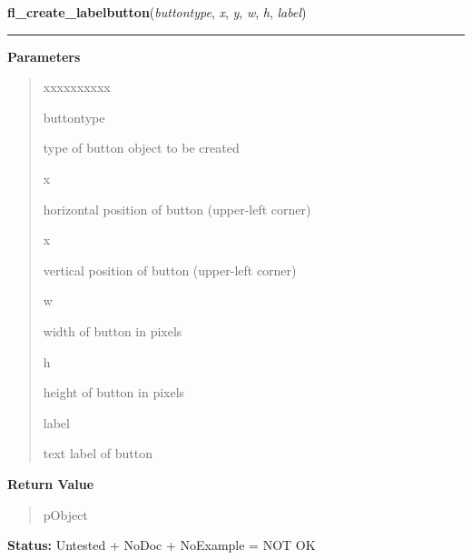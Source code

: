     \label{xformslib:library:fl_create_labelbutton}

    \vspace{0.5ex}

\hspace{.8\funcindent}\begin{boxedminipage}{\funcwidth}

    \raggedright \textbf{fl\_create\_labelbutton}(\textit{buttontype}, \textit{x}, \textit{y}, \textit{w}, \textit{h}, \textit{label})

    \vspace{-1.5ex}

    \rule{\textwidth}{0.5\fboxrule}
\setlength{\parskip}{2ex}
\setlength{\parskip}{1ex}
      \textbf{Parameters}
      \vspace{-1ex}

      \begin{quote}
        \begin{Ventry}{xxxxxxxxxx}

          \item[buttontype]

          type of button object to be created

          \item[x]

          horizontal position of button (upper-left corner)

          \item[x]

          vertical position of button (upper-left corner)

          \item[w]

          width of button in pixels

          \item[h]

          height of button in pixels

          \item[label]

          text label of button

        \end{Ventry}

      \end{quote}

      \textbf{Return Value}
    \vspace{-1ex}

      \begin{quote}
      pObject

      \end{quote}

\textbf{Status:} Untested + NoDoc + NoExample = NOT OK



    \end{boxedminipage}

